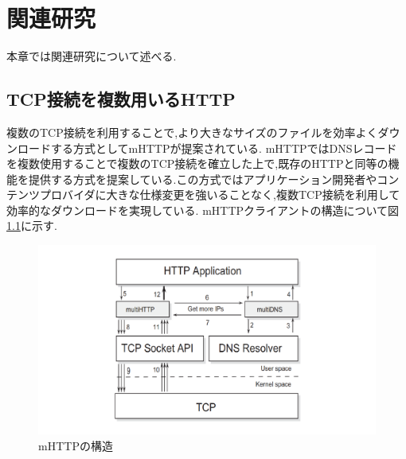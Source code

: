 \documentclass[a4j,12pt]{gradthesis_utf8}
\begin{document}
\chapter{関連研究}\label{sec:sec2}
本章では関連研究について述べる.

\section{TCP接続を複数用いるHTTP}
複数のTCP接続を利用することで,より大きなサイズのファイルを効率よくダウンロードする方式としてmHTTP\cite{mhttp}が提案されている.
mHTTPではDNSレコードを複数使用することで複数のTCP接続を確立した上で,既存のHTTPと同等の機能を提供する方式を提案している.この方式ではアプリケーション開発者やコンテンツプロバイダに大きな仕様変更を強いることなく,複数TCP接続を利用して効率的なダウンロードを実現している.
mHTTPクライアントの構造について図\ref{mhttp}に示す.

\begin{figure}[ht]
	\centering
	\includegraphics[width=16cm]{figure/mhttp.pdf}
	\caption{mHTTPの構造}
	\label{mhttp}
\end{figure}

\newpage
\end{document}
